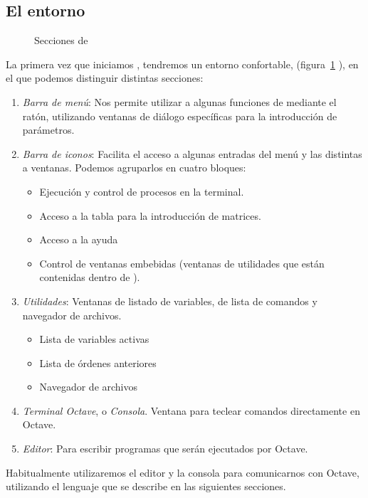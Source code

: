 \subsection*{El entorno \qtoctave}

\begin{figure}
\label{fig:qtoctave-secciones}
  \centering
  \caption{Secciones de \qtoctave}
  
\end{figure}
La primera vez que iniciamos \qtoctave, tendremos un entorno
confortable,
(figura~\ref{fig:qtoctave-secciones} ),
en el que podemos distinguir distintas secciones:
\begin{enumerate}
\item \emph{Barra de menú}: Nos permite utilizar a algunas funciones
  de \octave mediante el ratón, utilizando ventanas de diálogo
  específicas para la introducción de parámetros.
\item \emph{Barra de iconos}: Facilita el acceso a algunas entradas
  del menú y las distintas a ventanas. Podemos agruparlos en cuatro
  bloques:
  \begin{itemize}
  \item Ejecución y control de procesos en la terminal.
  \item Acceso a la tabla para la introducción de matrices.
  \item Acceso a la ayuda
  \item Control de ventanas embebidas (ventanas de utilidades
    que están contenidas dentro de \qtoctave).
  \end{itemize}
\item \emph{Utilidades}: Ventanas de listado de variables, de lista de
  comandos y navegador de archivos.
  \begin{itemize}
  \item Lista de variables activas
  \item Lista de órdenes anteriores
  \item Navegador de archivos
  \end{itemize}
\item \emph{Terminal Octave}, o \emph{Consola}. Ventana para teclear
  comandos directamente en Octave.
\item \emph{Editor}: Para escribir programas que serán ejecutados por Octave.
\end{enumerate}

Habitualmente utilizaremos el editor y la consola para comunicarnos
con Octave, utilizando el lenguaje que se describe en las siguientes secciones.

